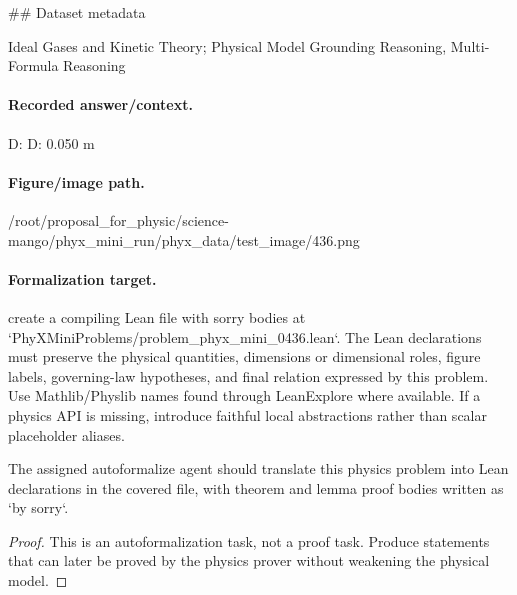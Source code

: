 \#\# Dataset metadata

Ideal Gases and Kinetic Theory; Physical Model Grounding Reasoning, Multi-Formula Reasoning

\paragraph{Recorded answer/context.}
D: D: 0.050 m

\paragraph{Figure/image path.}
/root/proposal\_for\_physic/science-mango/phyx\_mini\_run/phyx\_data/test\_image/436.png

\paragraph{Formalization target.}
create a compiling Lean file with sorry bodies at `PhyXMiniProblems/problem\_phyx\_mini\_0436.lean`. The Lean declarations must preserve the physical quantities, dimensions or dimensional roles, figure labels, governing-law hypotheses, and final relation expressed by this problem.
Use Mathlib/Physlib names found through LeanExplore where available. If a physics API is missing, introduce faithful local abstractions rather than scalar placeholder aliases.

\begin{theorem}
\label{thm:physics:phyx_mini_0436:target}
The assigned autoformalize agent should translate this physics problem into Lean declarations in the covered file, with theorem and lemma proof bodies written as `by sorry`.
\end{theorem}
\begin{proof}
This is an autoformalization task, not a proof task. Produce statements that can later be proved by the physics prover without weakening the physical model.
\end{proof}

